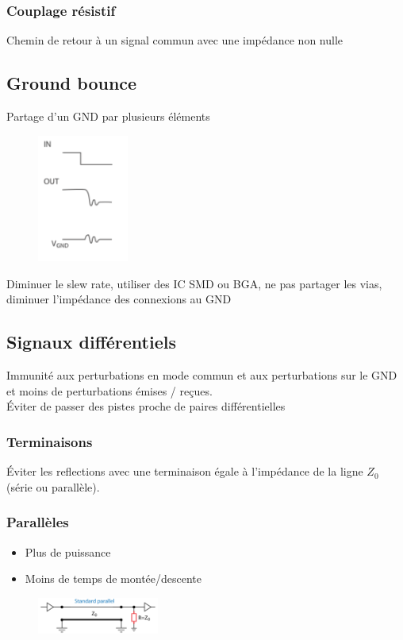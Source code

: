 \documentclass[resume]{subfiles}
\begin{document}
\begin{multicols}{3}
\subsubsection{Couplage résistif}
Chemin de retour à un signal commun avec une impédance non nulle
\subsection{Ground bounce}
Partage d'un GND par plusieurs éléments
\begin{figure}[H]
\centering
\includegraphics[width=3.00cm]{img_21.png}
\end{figure}
Diminuer le slew rate, utiliser des IC SMD ou BGA, ne pas partager les vias, diminuer l'impédance des connexions au GND
\subsection{Signaux différentiels}
Immunité aux perturbations en mode commun et aux perturbations sur le GND et moins de perturbations émises / reçues.\\
Éviter de passer des pistes proche de paires différentielles
\subsubsection{Terminaisons}
Éviter les reflections avec une terminaison égale à l'impédance de la ligne $Z_0$ (série ou parallèle).\\
\subsubsection{Parallèles}
\begin{itemize}
\item Plus de puissance
\item Moins de temps de montée/descente
\end{itemize}
\begin{figure}[H]
\centering
\includegraphics[width=4.00cm]{img_22.png}
\end{figure}

\end{multicols}
\end{document}
